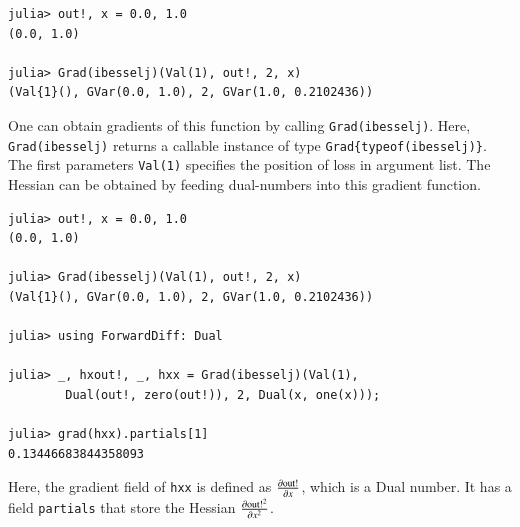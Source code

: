 \documentclass{article}
\newcommand{\<}{\langle}
\renewcommand{\>}{\rangle}
\theoremstyle{definition}\newtheorem{definition}{\textit{Definition}}
\begin{document}
\begin{minipage}{.88\columnwidth}
\begin{lstlisting}
julia> out!, x = 0.0, 1.0
(0.0, 1.0)

julia> Grad(ibesselj)(Val(1), out!, 2, x)
(Val{1}(), GVar(0.0, 1.0), 2, GVar(1.0, 0.2102436))
\end{lstlisting}
\end{minipage}

One can obtain gradients of this function by calling \texttt{Grad(ibesselj)}.
Here, \texttt{Grad(ibesselj)} returns a callable instance of type \texttt{Grad\{typeof(ibesselj)\}}. The first parameters \texttt{Val(1)} specifies the position of loss in argument list. 
The Hessian can be obtained by feeding dual-numbers into this gradient function.

\begin{minipage}{.88\columnwidth}
\begin{lstlisting}
julia> out!, x = 0.0, 1.0
(0.0, 1.0)

julia> Grad(ibesselj)(Val(1), out!, 2, x)
(Val{1}(), GVar(0.0, 1.0), 2, GVar(1.0, 0.2102436))

julia> using ForwardDiff: Dual

julia> _, hxout!, _, hxx = Grad(ibesselj)(Val(1), 
        Dual(out!, zero(out!)), 2, Dual(x, one(x)));

julia> grad(hxx).partials[1]
0.13446683844358093
\end{lstlisting}
\end{minipage}

Here, the gradient field of \texttt{hxx} is defined as $\frac{\partial {\rm out!}}{\partial x}$, which is a Dual number.
It has a field \texttt{partials} that store the Hessian $\frac{\partial{\rm out!}^2}{\partial x^2}$.
\end{document}
